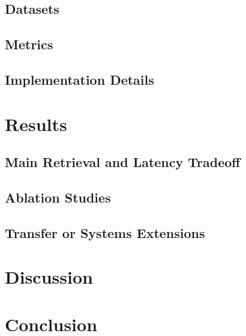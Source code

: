 \documentclass[11pt]{article}
\begin{document}
\subsection{Datasets}

\subsection{Metrics}

\subsection{Implementation Details}

\section{Results}
\subsection{Main Retrieval and Latency Tradeoff}

\subsection{Ablation Studies}

\subsection{Transfer or Systems Extensions}

\section{Discussion}

\section{Conclusion}



\end{document}
